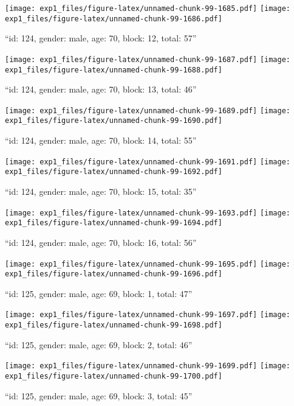 \documentclass[,]{article}
\begin{document}
\texttt{[image: exp1\_files/figure-latex/unnamed-chunk-99-1685.pdf]}
\texttt{[image: exp1\_files/figure-latex/unnamed-chunk-99-1686.pdf]}

\newpage
[1] 

``id: 124, gender: male, age: 70, block: 12, total: 57''

\texttt{[image: exp1\_files/figure-latex/unnamed-chunk-99-1687.pdf]}
\texttt{[image: exp1\_files/figure-latex/unnamed-chunk-99-1688.pdf]}

\newpage
[1] 

``id: 124, gender: male, age: 70, block: 13, total: 46''

\texttt{[image: exp1\_files/figure-latex/unnamed-chunk-99-1689.pdf]}
\texttt{[image: exp1\_files/figure-latex/unnamed-chunk-99-1690.pdf]}

\newpage
[1] 

``id: 124, gender: male, age: 70, block: 14, total: 55''

\texttt{[image: exp1\_files/figure-latex/unnamed-chunk-99-1691.pdf]}
\texttt{[image: exp1\_files/figure-latex/unnamed-chunk-99-1692.pdf]}

\newpage
[1] 

``id: 124, gender: male, age: 70, block: 15, total: 35''

\texttt{[image: exp1\_files/figure-latex/unnamed-chunk-99-1693.pdf]}
\texttt{[image: exp1\_files/figure-latex/unnamed-chunk-99-1694.pdf]}

\newpage
[1] 

``id: 124, gender: male, age: 70, block: 16, total: 56''

\texttt{[image: exp1\_files/figure-latex/unnamed-chunk-99-1695.pdf]}
\texttt{[image: exp1\_files/figure-latex/unnamed-chunk-99-1696.pdf]}

\newpage
[1] 

``id: 125, gender: male, age: 69, block: 1, total: 47''

\texttt{[image: exp1\_files/figure-latex/unnamed-chunk-99-1697.pdf]}
\texttt{[image: exp1\_files/figure-latex/unnamed-chunk-99-1698.pdf]}

\newpage
[1] 

``id: 125, gender: male, age: 69, block: 2, total: 46''

\texttt{[image: exp1\_files/figure-latex/unnamed-chunk-99-1699.pdf]}
\texttt{[image: exp1\_files/figure-latex/unnamed-chunk-99-1700.pdf]}

\newpage
[1] 

``id: 125, gender: male, age: 69, block: 3, total: 45''
\end{document}
